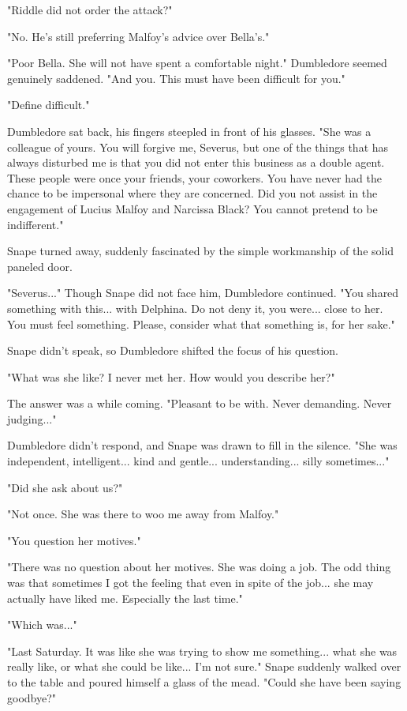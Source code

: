 "Riddle did not order the attack?"

"No. He's still preferring Malfoy's advice over Bella's."

"Poor Bella. She will not have spent a comfortable night." Dumbledore seemed genuinely saddened. "And you. This must have been difficult for you."

"Define difficult."

Dumbledore sat back, his fingers steepled in front of his glasses. "She was a colleague of yours. You will forgive me, Severus, but one of the things that has always disturbed me is that you did not enter this business as a double agent. These people were once your friends, your coworkers. You have never had the chance to be impersonal where they are concerned. Did you not assist in the engagement of Lucius Malfoy and Narcissa Black? You cannot pretend to be indifferent."

Snape turned away, suddenly fascinated by the simple workmanship of the solid paneled door.

"Severus..." Though Snape did not face him, Dumbledore continued. "You shared something with this... with Delphina. Do not deny it, you were... close to her. You must feel something. Please, consider what that something is, for her sake."

Snape didn't speak, so Dumbledore shifted the focus of his question.

"What was she like? I never met her. How would you describe her?"

The answer was a while coming. "Pleasant to be with. Never demanding. Never judging..."

Dumbledore didn't respond, and Snape was drawn to fill in the silence. "She was independent, intelligent... kind and gentle... understanding... silly sometimes..."

"Did she ask about us?"

"Not once. She was there to woo me away from Malfoy."

"You question her motives."

"There was no question about her motives. She was doing a job. The odd thing was that sometimes I got the feeling that even in spite of the job... she may actually have liked me. Especially the last time."

"Which was..."

"Last Saturday. It was like she was trying to show me something... what she was really like, or what she could be like... I'm not sure." Snape suddenly walked over to the table and poured himself a glass of the mead. "Could she have been saying goodbye?"

